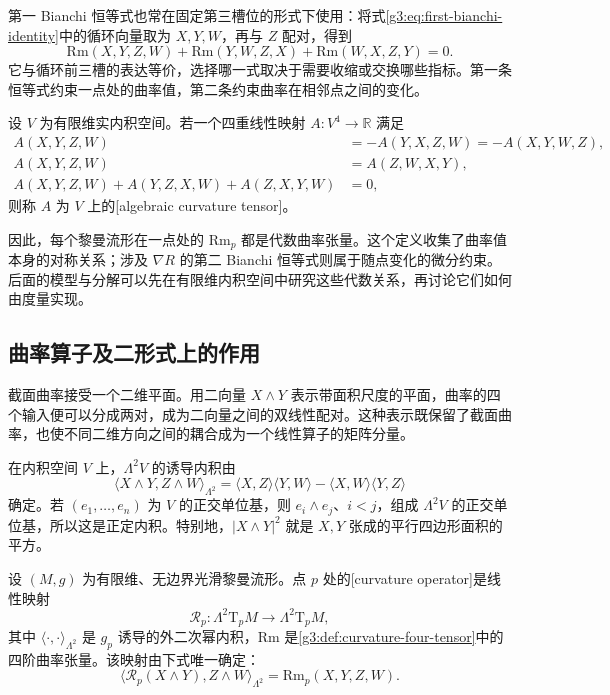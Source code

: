 第一 Bianchi 恒等式也常在固定第三槽位的形式下使用：将式\eqref{g3:eq:first-bianchi-identity}中的循环向量取为 \(X,Y,W\)，再与 \(Z\) 配对，得到
\[
	\mathrm{Rm}(X,Y,Z,W)
	+\mathrm{Rm}(Y,W,Z,X)
	+\mathrm{Rm}(W,X,Z,Y)=0.
\]
它与循环前三槽的表达等价，选择哪一式取决于需要收缩或交换哪些指标。第一条恒等式约束一点处的曲率值，第二条约束曲率在相邻点之间的变化。

\begin{definition}\label{g3:def:algebraic-curvature-tensor}
	设 \(V\) 为有限维实内积空间。若一个四重线性映射 \(A:V^4\to\mathbb R\) 满足
	\begin{align*}
		A(X,Y,Z,W)&=-A(Y,X,Z,W)=-A(X,Y,W,Z),\\
		A(X,Y,Z,W)&=A(Z,W,X,Y),\\
		A(X,Y,Z,W)+A(Y,Z,X,W)+A(Z,X,Y,W)&=0,
	\end{align*}
	则称 \(A\) 为 \(V\) 上的[algebraic curvature tensor]。
\end{definition}

因此，每个黎曼流形在一点处的 \(\mathrm{Rm}_p\) 都是代数曲率张量。这个定义收集了曲率值本身的对称关系；涉及 \(\nabla R\) 的第二 Bianchi 恒等式则属于随点变化的微分约束。后面的模型与分解可以先在有限维内积空间中研究这些代数关系，再讨论它们如何由度量实现。

\subsection{曲率算子及二形式上的作用}
\label{g3:subsec:0301:04}

截面曲率接受一个二维平面。用二向量 \(X\wedge Y\) 表示带面积尺度的平面，曲率的四个输入便可以分成两对，成为二向量之间的双线性配对。这种表示既保留了截面曲率，也使不同二维方向之间的耦合成为一个线性算子的矩阵分量。

\ProseParagraphBreak

在内积空间 \(V\) 上，\(\Lambda^2V\) 的诱导内积由
\[
	\langle X\wedge Y,Z\wedge W\rangle_{\Lambda^2}
	=\langle X,Z\rangle\langle Y,W\rangle
	-\langle X,W\rangle\langle Y,Z\rangle
\]
确定。若 \((e_1,\ldots,e_n)\) 为 \(V\) 的正交单位基，则 \(e_i\wedge e_j\)、\(i<j\)，组成 \(\Lambda^2V\) 的正交单位基，所以这是正定内积。特别地，\(|X\wedge Y|^2\) 就是 \(X,Y\) 张成的平行四边形面积的平方。

\begin{definition}\label{g3:def:curvature-operator}
	设 \((M,g)\) 为有限维、无边界光滑黎曼流形。点 \(p\) 处的[curvature operator]是线性映射
	\[
		\mathcal R_p:\Lambda^2\mathrm{T}_pM\longrightarrow
			\Lambda^2\mathrm{T}_pM,
	\]
	其中 \(\langle\cdot,\cdot\rangle_{\Lambda^2}\) 是 \(g_p\) 诱导的外二次幂内积，\(\mathrm{Rm}\) 是\cref{g3:def:curvature-four-tensor}中的四阶曲率张量。该映射由下式唯一确定：
	\begin{equation}\label{g3:eq:curvature-operator-pairing}
		\bigl\langle\mathcal R_p(X\wedge Y),Z\wedge W\bigr\rangle_{\Lambda^2}
		=\mathrm{Rm}_p(X,Y,Z,W).
	\end{equation}
\end{definition}

